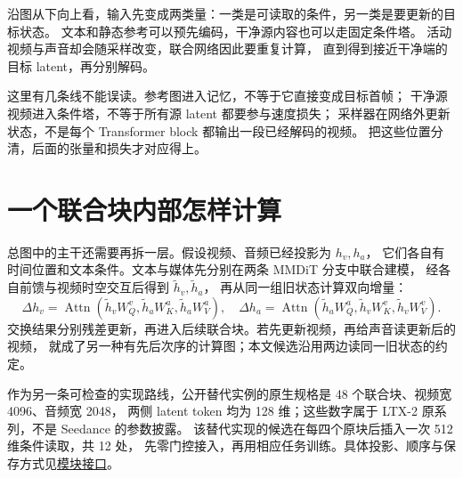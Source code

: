 沿图从下向上看，输入先变成两类量：一类是可读取的条件，另一类是要更新的目标状态。
文本和静态参考可以预先编码，干净源内容也可以走固定条件塔。
活动视频与声音却会随采样改变，联合网络因此要重复计算，
直到得到接近干净端的目标 latent，再分别解码。

这里有几条线不能误读。参考图进入记忆，不等于它直接变成目标首帧；
干净源视频进入条件塔，不等于所有源 latent 都要参与速度损失；
采样器在网络外更新状态，不是每个 Transformer block 都输出一段已经解码的视频。
把这些位置分清，后面的张量和损失才对应得上。






\clearpage
\section{一个联合块内部怎样计算}
总图中的主干还需要再拆一层。假设视频、音频已经投影为 $h_v,h_a$，
它们各自有时间位置和文本条件。文本与媒体先分别在两条 MMDiT 分支中联合建模，
经各自前馈与视频时空交互后得到 $\tilde h_v,\tilde h_a$，
再从同一组旧状态计算双向增量：
\[
\Delta h_v=\operatorname{Attn}(\tilde h_vW_Q^v,\tilde h_aW_K^a,\tilde h_aW_V^a),
\quad
\Delta h_a=\operatorname{Attn}(\tilde h_aW_Q^a,\tilde h_vW_K^v,\tilde h_vW_V^v).
\]
交换结果分别残差更新，再进入后续联合块。若先更新视频，再给声音读更新后的视频，
就成了另一种有先后次序的计算图；本文候选沿用两边读同一旧状态的约定。

作为另一条可检查的实现路线，公开替代实例的原生规格是 48 个联合块、视频宽 4096、音频宽 2048，
两侧 latent token 均为 128 维；这些数字属于 LTX-2 原系列，不是 Seedance 的参数披露。
该替代实现的候选在每四个原块后插入一次 512 维条件读取，共 12 处，
先零门控接入，再用相应任务训练。具体投影、顺序与保存方式见\hyperref[seedance-m21]{模块接口}。

